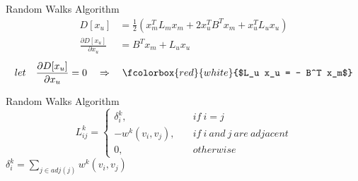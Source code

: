 \documentclass[14pt]{beamer}
\begin{document}
\begin{frame}{Random Walks Algorithm}
    \begin{equation*}
        \begin{split}
            D[x_u] &= \frac{1}{2}(x_m^T L_m x_m + 2 x_u^T B^T x_m + x_u^T L_u x_u) \\
            \frac {\partial D[x_u]} {\partial x_u} &= B^Tx_m + L_u x_u
        \end{split}
    \end{equation*}
    \pause
    \[
        let \quad \frac {\partial D[x_u]} {\partial x_u} = 0
        \quad \Rightarrow \quad
        \setlength{\fboxrule}{2pt}
        \fcolorbox{red}{white}{$L_u x_u = - B^T x_m$}
    \]
\end{frame}
\begin{frame}{Random Walks Algorithm}
    \[
        L_{ij}^k = 
        \begin{cases} 
            \delta_i^k ,\quad & if\ i=j \\
            -w^k(v_i, v_j) ,\quad & if\ i\ and\ j\ are\ adjacent \\
            0, \quad & otherwise
        \end{cases}
    \]
    \pause
    $\delta_i^k = \sum_{j \in adj(j)} w^k(v_i, v_j)$
\end{frame}
\end{document}
